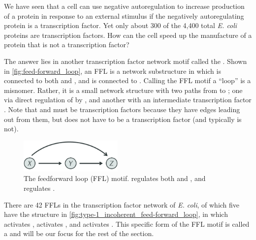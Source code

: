 We have seen that a cell can use negative autoregulation to increase production of a protein in response to an external stimulus if the negatively autoregulating protein is a transcription factor. Yet only about 300 of the 4,400 total \textit{E. coli} proteins are transcription factors. How can the cell speed up the manufacture of a protein that is not a transcription factor?

The answer lies in another transcription factor network motif called the . Shown in \autoref{fig:feed-forward_loop}, an FFL is a network substructure in which  is connected to both  and , and  is connected to . Calling the FFL motif a ``loop'' is a misnomer. Rather, it is a small network structure with two paths from  to ; one via direct regulation of  by , and another with an intermediate transcription factor . Note that  and  must be transcription factors because they have edges leading out from them, but  does not have to be a transcription factor (and typically is not).\\

\begin{figure}[h]
\centering
\mySfFamily
\includegraphics[width = 0.45\textwidth]{../images_CMYK/feed-forward_loop}
\caption{The feedforward loop (FFL) motif.  regulates both  and , and  regulates .}
\label{fig:feed-forward_loop}
\end{figure}

 There are 42 FFLs in the transcription factor network of \textit{E. coli}, of which five have the structure in \autoref{fig:type-1_incoherent_feed-forward_loop}, in which  activates ,  activates , and  activates . This specific form of the FFL motif is  called a  and will be our focus for the rest of the section.\\
 
